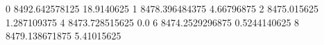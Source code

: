 0 8492.642578125 18.9140625
1 8478.396484375 4.66796875
2 8475.015625 1.287109375
4 8473.728515625 0.0
6 8474.2529296875 0.5244140625
8 8479.138671875 5.41015625
